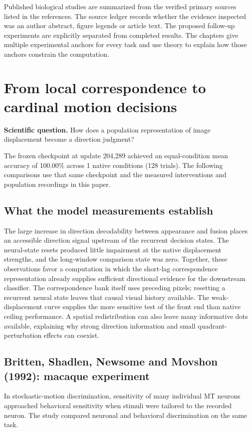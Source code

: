\documentclass[11pt]{article}
\begin{document}
Published biological studies are summarized from the verified primary sources listed in the references. The source ledger records whether the evidence inspected was an author abstract, figure legends or article text. The proposed follow-up experiments are explicitly separated from completed results. The chapters give multiple experimental anchors for every task and use theory to explain how those anchors constrain the computation.
\clearpage\section{From local correspondence to cardinal motion decisions}
\textbf{Scientific question.} How does a population representation of image displacement become a direction judgment?

The frozen checkpoint at update 204,289 achieved an equal-condition mean accuracy of 100.00\% across 1 native conditions (128 trials). The following comparisons use that same checkpoint and the measured interventions and population recordings in this paper.

\subsection{What the model measurements establish}
The large increase in direction decodability between appearance and fusion places an accessible direction signal upstream of the recurrent decision states. The neural-state resets produced little impairment at the native displacement strengths, and the long-window comparison state was zero. Together, these observations favor a computation in which the short-lag correspondence representation already supplies sufficient directional evidence for the downstream classifier. The correspondence bank itself uses preceding pixels; resetting a recurrent neural state leaves that causal visual history available. The weak-displacement curve supplies the more sensitive test of the front end than native ceiling performance. A spatial redistribution can also leave many informative dots available, explaining why strong direction information and small quadrant-perturbation effects can coexist.

\subsection{Britten, Shadlen, Newsome and Movshon (1992): macaque experiment}
In stochastic-motion discrimination, sensitivity of many individual MT neurons approached behavioral sensitivity when stimuli were tailored to the recorded neuron. The study compared neuronal and behavioral discrimination on the same task. \cite{bio_britten}
\end{document}
